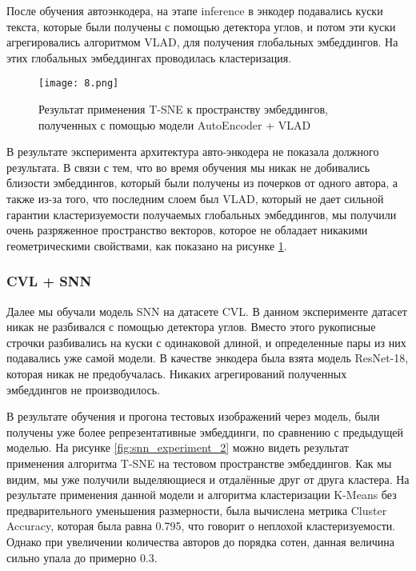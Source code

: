 После обучения автоэнкодера, на этапе inference в энкодер подавались куски текста, которые были получены с помощью детектора углов, и потом эти куски агрегировались алгоритмом VLAD, для получения глобальных эмбеддингов. На этих глобальных эмбеддингах проводилась кластеризация. 

\begin{figure}[htbp]
    \centering
    \texttt{[image: 8.png]}
    \captionsetup{width=0.9\textwidth}
    \caption{Результат применения T-SNE к пространству эмбеддингов, полученных с помощью модели AutoEncoder + VLAD}
    \label{fig:autoencoder_result}
\end{figure}

В результате эксперимента архитектура авто-энкодера не показала должного результата. В связи с тем, что во время обучения мы никак не добивались близости эмбеддингов, который были получены из почерков от одного автора, а также из-за того, что последним слоем был VLAD, который не дает сильной гарантии кластеризуемости получаемых глобальных эмбеддингов, мы получили очень разряженное пространство векторов, которое не обладает никакими геометрическими свойствами, как показано на рисунке \ref{fig:autoencoder_result}.

\subsubsection{CVL + SNN}


Далее мы обучали модель SNN на датасете CVL. В данном эксперименте датасет никак не разбивался с помощью детектора углов. Вместо этого рукописные строчки разбивались на куски с одинаковой длиной, и определенные пары из них подавались уже самой модели. В качестве энкодера была взята модель ResNet-18, которая никак не предобучалась. Никаких агрегирований полученных эмбеддингов не производилось.

В результате обучения и прогона тестовых изображений через модель, были получены уже более репрезентативные эмбеддинги, по сравнению с предыдущей моделью. На рисунке \ref{fig:snn_experiment_2} можно видеть результат применения алгоритма T-SNE на тестовом пространстве эмбеддингов. Как мы видим, мы уже получили выделяющиеся и отдалённые друг от друга кластера. На результате применения данной модели и алгоритма кластеризации K-Means без предварительного уменьшения размерности, была вычислена метрика Cluster Accuracy, которая была равна 0.795, что говорит о неплохой кластеризуемости. Однако при увеличении количества авторов до порядка сотен, данная величина сильно упала до примерно 0.3.

